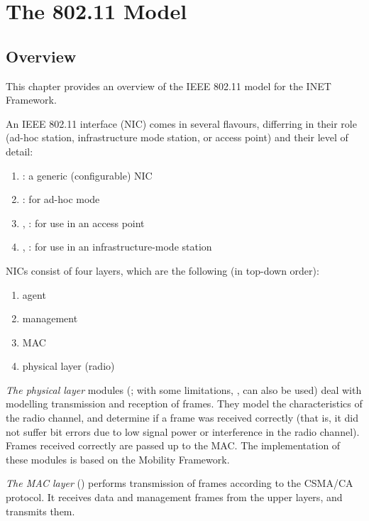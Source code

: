 \chapter{The 802.11 Model}
\label{cha:80211}


\section{Overview}

This chapter provides an overview of the IEEE 802.11 model for the INET Framework.

An IEEE 802.11 interface (NIC) comes in several flavours, differring
in their role (ad-hoc station, infrastructure mode station, or
access point) and their level of detail:

\begin{enumerate}
 \item {}: a generic (configurable) NIC
 \item {}: for ad-hoc mode
 \item {}, : for use in an access point
 \item {}, : for use in an
   infrastructure-mode station
\end{enumerate}

NICs consist of four layers, which are the following (in top-down order):

\begin{enumerate}
  \item agent
  \item management
  \item MAC
  \item physical layer (radio)
\end{enumerate}

\textit{The physical layer} modules (; with some limitations,
,  can also be used) deal with modelling
transmission and reception of frames. They model the characteristics of
the radio channel, and determine if a frame was received correctly
(that is, it did not suffer bit errors due to low signal power or
interference in the radio channel). Frames received correctly are passed
up to the MAC. The implementation of these modules is based on the
Mobility Framework.

\textit{The MAC layer} () performs transmission of frames according
to the CSMA/CA protocol. It receives data and management frames from
the upper layers, and transmits them.

